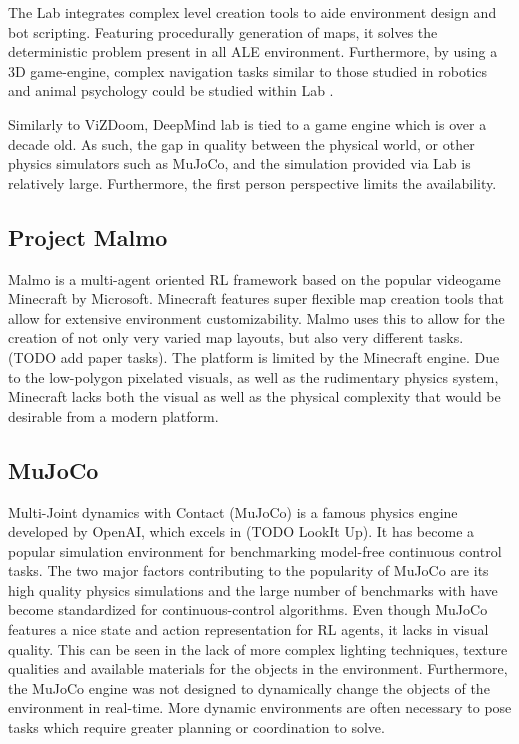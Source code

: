 The Lab integrates complex level creation tools to aide environment design and bot scripting. Featuring procedurally generation of maps, it solves the deterministic problem present in all ALE environment. Furthermore, by using a 3D game-engine, complex navigation tasks similar to those studied in robotics and animal psychology could be studied within Lab \citep{Leibo2018}.

Similarly to ViZDoom, DeepMind lab is tied to a game engine which is over a decade old. As such, the gap in quality between the physical world, or other physics simulators such as MuJoCo, and the simulation provided via Lab is relatively large. Furthermore, the first person perspective limits the availability.
 
\subsection{Project Malmo}
Malmo \citep{Johnson2016} is a multi-agent oriented RL framework based on the popular videogame Minecraft by Microsoft. Minecraft features super flexible map creation tools that allow for extensive environment customizability. Malmo uses this to allow for the creation of not only very varied map layouts, but also very different tasks. (TODO add paper tasks). The platform is limited by the Minecraft engine. Due to the low-polygon pixelated visuals, as well as the rudimentary physics system, Minecraft lacks both the visual as well as the physical complexity that would be desirable from a modern platform.
 
\subsection{MuJoCo}
Multi-Joint dynamics with Contact (MuJoCo) is a famous physics engine developed by OpenAI, which excels in (TODO LookIt Up). It has become a popular simulation environment for benchmarking model-free continuous control tasks. The two major factors contributing to the popularity of MuJoCo are its high quality physics simulations and the large number of benchmarks with have become standardized for continuous-control algorithms. Even though MuJoCo features a nice state and action representation for RL agents, it lacks in visual quality. This can be seen in the lack of more complex lighting techniques, texture qualities and available materials for the objects in the environment. Furthermore, the MuJoCo engine was not designed to dynamically change the objects of the environment in real-time. More dynamic environments are often necessary to pose tasks which require greater planning or coordination to solve.



